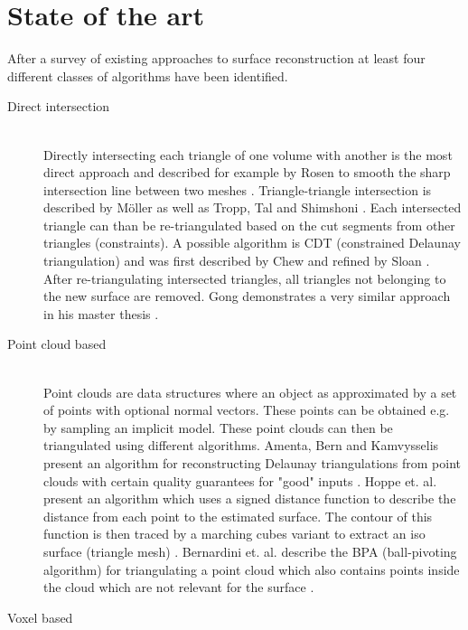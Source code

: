 
\section{State of the art}

After a survey of existing approaches to surface reconstruction at least four different classes of algorithms have been identified.

\begin{description}
	
\item[Direct intersection] \hfill \\
Directly intersecting each triangle of one volume with another is the most direct approach and described for example by Rosen to smooth the sharp intersection line between two meshes \cite{mesh_intersection}. Triangle-triangle intersection is described by M\"oller \cite{tri_tri_intersection_moller} as well as Tropp, Tal and Shimshoni \cite{tri_tri_intersection_2}. Each intersected triangle can than be re-triangulated based on the cut segments from other triangles (constraints). A possible algorithm is CDT (constrained Delaunay triangulation) and was first described by Chew \cite{CDT} and refined by Sloan \cite{CDT_fast}. After re-triangulating intersected triangles, all triangles not belonging to the new surface are removed. Gong demonstrates a very similar approach in his master thesis \cite{cutter_workpiece_engagement}.

\item[Point cloud based] \hfill \\
Point clouds are data structures where an object as approximated by a set of points with optional normal vectors. These points can be obtained e.g. by sampling an implicit model. These point clouds can then be triangulated using different algorithms. 
Amenta, Bern and Kamvysselis present an algorithm for reconstructing Delaunay triangulations from point clouds with certain quality guarantees for "good" inputs \cite{vornoi_surface_reconstruction}.
Hoppe et. al. present an algorithm which uses a signed distance function to describe the distance from each point to the estimated surface. The contour of this function is then traced by a marching cubes variant to extract an iso surface (triangle mesh) \cite{surface_reconstruction}.
Bernardini et. al. describe the BPA (ball-pivoting algorithm) for triangulating a point cloud which also contains points inside the cloud which are not relevant for the surface \cite{BPA}.


\item[Voxel based] \hfill \\


\end{description}
